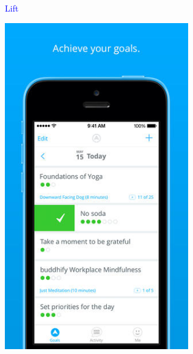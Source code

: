 \documentclass[landscape]{slides}
\begin{document}















\begin{slide}

    \textcolor{blue}{\Large{Lift}}

    \begin{center}
        \includegraphics[width=8cm]{lift}
    \end{center}

\end{slide}
\end{document}
